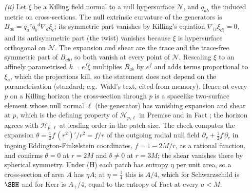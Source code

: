 \emph{(ii)} Let $\xi$ be a Killing field normal to a null hypersurface $\mathcal{N}$, and $q_{ab}$ the induced metric on cross-sections. The null extrinsic curvature of the generators is $B_{ab} = q_{a}{}^{c}q_{b}{}^{d}\nabla_{d}\xi_{c}$; its symmetric part vanishes by Killing's equation $\nabla_{(c}\xi_{d)} = 0$, and its antisymmetric part (the twist) vanishes because $\xi$ is hypersurface orthogonal on $\mathcal{N}$. The expansion and shear are the trace and the trace-free symmetric part of $B_{ab}$, so both vanish at every point of $\mathcal{N}$. Rescaling $\xi$ to an affinely parametrised $k = e^{f}\xi$ multiplies $B_{ab}$ by $e^{f}$ and adds terms proportional to $\xi_{a}$, which the projections kill, so the statement does not depend on the parametrisation (standard; e.g.\ Wald's text, cited from memory). Hence at every $p$ on a Killing horizon the cross-section through $p$ is a spacelike two-surface element whose null normal $\ell$ (the generator) has vanishing expansion and shear at $p$, which is the defining property of $\mathcal{H}_{p,\ell}$ in Premise  and in Fact ; the horizon agrees with $\mathcal{H}_{p,\ell}$ at leading order in the patch size. The check computes the expansion $\theta = \tfrac12 f\,(r^{2})'/r^{2} = f/r$ of the outgoing radial null field $\partial_{v} + \tfrac12 f\,\partial_{r}$ in ingoing Eddington-Finkelstein coordinates, $f = 1 - 2M/r$, as a rational function, and confirms $\theta = 0$ at $r = 2M$ and $\theta \ne 0$ at $r = 3M$; the shear vanishes there by spherical symmetry. Under (H) each patch has entropy $\eta$ per unit area, so a cross-section of area $A$ has $\eta A$; at $\eta = \tfrac14$ this is $A/4$, which for Schwarzschild is $\SBH$ and for Kerr is $A_{+}/4$, equal to the entropy of Fact  at every $a < M$.

